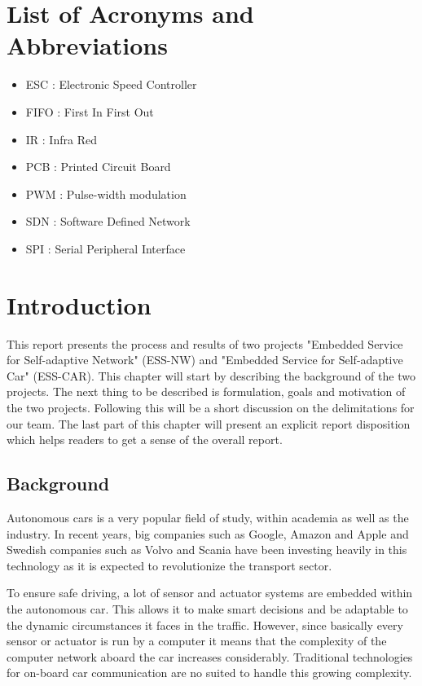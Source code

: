 \documentclass[11pt, titlepage]{article} %
\begin{document}
\section*{List of Acronyms and Abbreviations}
\begin{itemize}
        \item ESC : Electronic Speed Controller
        \item FIFO : First In First Out
        \item IR : Infra Red
        \item PCB : Printed Circuit Board
	\item PWM : Pulse-width modulation
	\item SDN : Software Defined Network
	\item SPI : Serial Peripheral Interface
\end{itemize}

\clearpage
\section{Introduction}
This report presents the process and results of two projects "Embedded Service for Self-adaptive Network" (ESS-NW) and "Embedded Service for Self-adaptive Car" (ESS-CAR). This chapter will start by describing the background of the two projects. The next thing to be described is formulation, goals and motivation of the two projects. Following this will be a short discussion on the delimitations for our team. The last part of this chapter will present an explicit report disposition which helps readers to get a sense of the overall report.

\subsection{Background}
Autonomous cars is a very popular field of study, within academia as well as the industry.
In recent years, big companies such as Google, Amazon and Apple and Swedish companies such
as Volvo and Scania have been investing heavily in this technology as it is expected to
revolutionize the transport sector.

To ensure safe driving, a lot of sensor and actuator systems are embedded within the autonomous
car. This allows it to make smart decisions and be adaptable to the dynamic circumstances it
faces in the traffic. However, since basically every sensor or actuator is run by a computer it
means that the complexity of the computer network aboard the car increases considerably.
Traditional technologies for on-board car communication are no suited to handle this
growing complexity.
\end{document}
